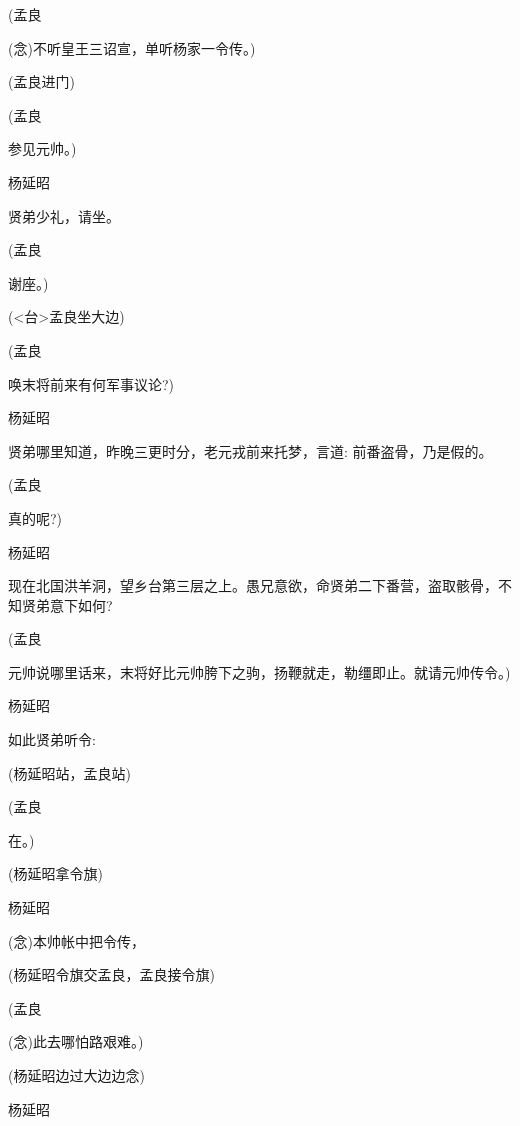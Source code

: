 {(孟良\hspace{30pt}~

({\akai 念})不听皇王三诏宣，单听杨家一令传。)

({孟良进门})

(孟良\hspace{30pt}~

参见元帅。)

杨延昭\hspace{20pt}~

贤弟少礼，请坐。

(孟良\hspace{30pt}~

谢座。)

({\textless{}台\textgreater{}}孟良坐大边)

(孟良\hspace{30pt}~

唤末将前来有何军事议论?)

杨延昭

贤弟哪里知道，昨晚三更时分，老元戎前来托梦，言道: 前番盗骨，乃是假的。

(孟良\hspace{30pt}~

真的呢?)

杨延昭

现在北国洪羊洞，望乡台第三层之上。愚兄意欲，命贤弟二下番营，盗取骸骨，不知贤弟意下如何?

(孟良

元帅说哪里话来，末将好比元帅胯下之驹，扬鞭就走，勒缰即止。就请元帅传令。)

杨延昭\hspace{20pt}~

如此贤弟听令: 

(杨延昭站，孟良站)

(孟良\hspace{30pt}~

在。)

(杨延昭拿令旗)

杨延昭\hspace{20pt}~

({\akai 念})本帅帐中把令传，

(杨延昭令旗交孟良，孟良接令旗)

(孟良\hspace{30pt}~

({\akai 念})此去哪怕路艰难。)

(杨延昭边过大边边念)

杨延昭\hspace{20pt}~

}
